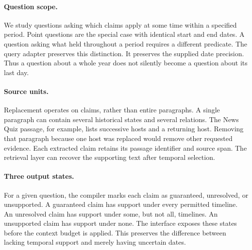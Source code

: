 \paragraph{Question scope.}
We study questions asking which claims apply at some time within a specified period.
Point questions are the special case with identical start and end dates.
A question asking what held throughout a period requires a different predicate.
The query adapter preserves this distinction.
It preserves the supplied date precision.
Thus a question about a whole year does not silently become a question about its last day.

\paragraph{Source units.}
Replacement operates on claims, rather than entire paragraphs.
A single paragraph can contain several historical states and several relations.
The News Quiz passage, for example, lists successive hosts and a returning host.
Removing that paragraph because one host was replaced would remove other requested evidence.
Each extracted claim retains its passage identifier and source span.
The retrieval layer can recover the supporting text after temporal selection.

\paragraph{Three output states.}
For a given question, the compiler marks each claim as guaranteed, unresolved, or unsupported.
A guaranteed claim has support under every permitted timeline.
An unresolved claim has support under some, but not all, timelines.
An unsupported claim has support under none.
The interface exposes these states before the context budget is applied.
This preserves the difference between lacking temporal support and merely having uncertain dates.
